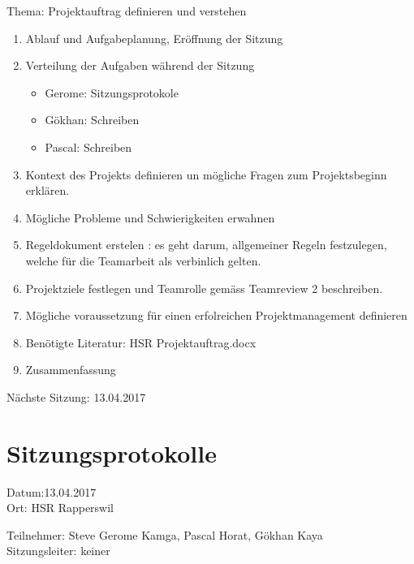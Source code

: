 Thema: Projektauftrag definieren und verstehen
\begin{enumerate}

\item Ablauf und Aufgabeplanung, Eröffnung der Sitzung 

\item  Verteilung der Aufgaben während der Sitzung
\begin{itemize}
\item Gerome: Sitzungsprotokole
\item Gökhan: Schreiben
\item Pascal: Schreiben 
\end{itemize}

\item Kontext des Projekts definieren un mögliche Fragen zum Projektsbeginn erklären.

\item Mögliche Probleme und Schwierigkeiten erwahnen

\item Regeldokument erstelen : es geht darum, allgemeiner Regeln festzulegen, welche für die Teamarbeit als verbinlich gelten.

\item Projektziele festlegen und Teamrolle gemäss Teamreview 2 beschreiben.

\item Mögliche voraussetzung für einen erfolreichen Projektmanagement definieren

\item Benötigte Literatur: HSR Projektauftrag.docx   

\item Zusammenfassung

\end{enumerate}

Nächste Sitzung: 13.04.2017




\newpage

\section*{Sitzungsprotokolle}

Datum:13.04.2017\\
Ort: HSR Rapperswil

Teilnehmer: Steve Gerome Kamga, Pascal Horat, Gökhan Kaya\\
Sitzungsleiter: keiner

